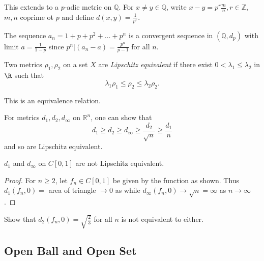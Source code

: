 \documentclass[a4paper]{article}
\begin{document}
This extends to a $p$-adic metric on $\mathbb{Q}$. For $x\neq y \in \mathbb{Q}$, write $x-y = p^r \frac{m}{n}, r\in\mathbb{Z}$, $m, n$ coprime ot $p$ and define $d(x,y) = \frac{1}{p^r}$.

\begin{ex}
  The sequence $a_n = 1+p+p^2+ \dots + p^n$ is a convergent sequence in $(\mathbb{Q},d_p)$ with limit $a = \frac{1}{1-p}$ since $p^n | (a_n-a) = \frac{p^n}{p-1}$ for all $n$.
\end{ex}

\begin{definition}
  Two metrics $\rho_1, \rho_2$ on a set $X$ are \emph{Lipschitz equivalent} if there exist \(0 < \lambda_1 \leq \lambda_2\) in \(\R\) such that
  \[
    \lambda_1 \rho_1 \leq \rho_2 \leq \lambda_2\rho_2.
  \]
\end{definition}

This is an equivalence relation.

\begin{remark}
  For metrics $d_1, d_2, d_\infty$ on $\mathbb{R}^n$, one can show that
  \[
    d_1 \geq d_2 \geq d_\infty \geq \frac{d_2}{\sqrt n} \geq \frac{d_1}{n}
  \]
  and so are Lipschitz equivalent.
\end{remark}

\begin{proposition}
  $d_1$ and $d_\infty$ on $C[0,1]$ are not Lipschitz equivalent.
\end{proposition}

\begin{proof}
  For $n \geq 2$, let $f_n \in C[0,1]$ be given by the function as shown. Thus $d_1(f_n,0) =$ area of triangle $\to 0$ as while $d_\infty(f_n,0) \to \sqrt n = \infty$ as $n \to \infty$.
\end{proof}

\begin{center}
\end{center}

\begin{ex}
  Show that $d_2(f_n,0) = \sqrt{\frac{2}{3}}$ for all $n$ is not equivalent to either.
\end{ex}

\subsection{Open Ball and Open Set}
\end{document}

